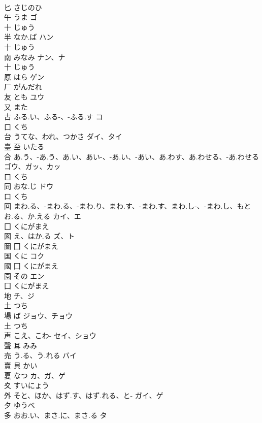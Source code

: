 \documentclass[8pt]{extreport}
\begin{document}
\begin{CJK}{UTF8}{min}
\\	匕		さじのひ		
\\	午	うま	ゴ	
\\	十		じゅう		
\\	半	なか.ば	ハン	
\\	十		じゅう		
\\	南	みなみ	ナン、ナ	
\\	十		じゅう		
\\	原	はら	ゲン	
\\	厂		がんだれ		
\\	友	とも	ユウ	
\\	又		また		
\\	古	ふる.い、ふる-、-ふる.す	コ	
\\	口		くち		
\\	台	うてな、われ、つかさ	ダイ、タイ	
\\	臺	至		いたる		
\\	合	あ.う、-あ.う、あ.い、あい-、-あ.い、-あい、あ.わす、あ.わせる、-あ.わせる	ゴウ、ガッ、カッ	
\\	口		くち		
\\	同	おな.じ	ドウ	
\\	口		くち		
\\	回	まわ.る、-まわ.る、-まわ.り、まわ.す、-まわ.す、まわ.し-、-まわ.し、もとお.る、か.える	カイ、エ	
\\	囗		くにがまえ		
\\	図	え、はか.る	ズ、ト	
\\	圖	囗		くにがまえ		
\\	国	くに	コク	
\\	國	囗		くにがまえ		
\\	園	その	エン	
\\	囗		くにがまえ		
\\	地		チ、ジ	
\\	土		つち		
\\	場	ば	ジョウ、チョウ	
\\	土		つち		
\\	声	こえ、こわ-	セイ、ショウ	
\\	聲	耳		みみ		
\\	売	う.る、う.れる	バイ	
\\	賣	貝		かい		
\\	夏	なつ	カ、ガ、ゲ	
\\	夊		すいにょう		
\\	外	そと、ほか、はず.す、はず.れる、と-	ガイ、ゲ	
\\	夕		ゆうべ		
\\	多	おお.い、まさ.に、まさ.る	タ	

\end{CJK}
\end{document}
